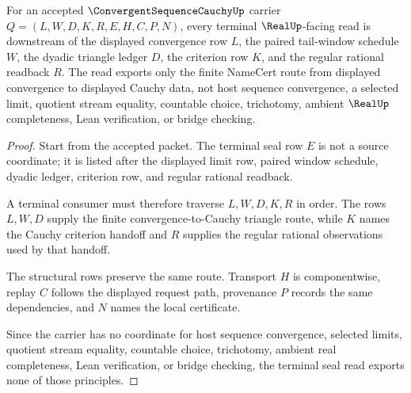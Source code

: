 \begin{theorem}\label{thm:convergent-sequence-cauchy-real-seal-boundary}
For an accepted $\ConvergentSequenceCauchyUp$ carrier $Q=(L,W,D,K,R,E,H,C,P,N)$, every terminal $\RealUp$-facing read is downstream of the displayed convergence row $L$, the paired tail-window schedule $W$, the dyadic triangle ledger $D$, the criterion row $K$, and the regular rational readback $R$. The read exports only the finite NameCert route from displayed convergence to displayed Cauchy data, not host sequence convergence, a selected limit, quotient stream equality, countable choice, trichotomy, ambient $\RealUp$ completeness, Lean verification, or bridge checking.
\end{theorem}
\begin{proof}
Start from the accepted packet. The terminal seal row $E$ is not a source coordinate; it is listed after the displayed limit row, paired window schedule, dyadic ledger, criterion row, and regular rational readback.

A terminal consumer must therefore traverse $L,W,D,K,R$ in order. The rows $L,W,D$ supply the finite convergence-to-Cauchy triangle route, while $K$ names the Cauchy criterion handoff and $R$ supplies the regular rational observations used by that handoff.

The structural rows preserve the same route. Transport $H$ is componentwise, replay $C$ follows the displayed request path, provenance $P$ records the same dependencies, and $N$ names the local certificate.

Since the carrier has no coordinate for host sequence convergence, selected limits, quotient stream equality, countable choice, trichotomy, ambient real completeness, Lean verification, or bridge checking, the terminal seal read exports none of those principles.
\end{proof}


